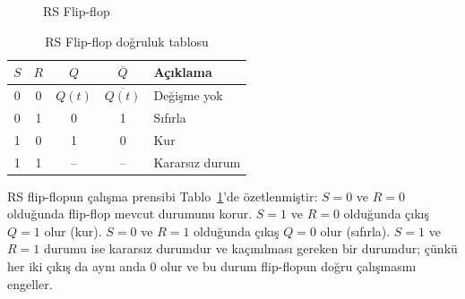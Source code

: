 \begin{figure}[H]
\centering
{}
\caption{RS Flip-flop}
\label{fig:B.24}
\end{figure}

\begin{table}[H]
\centering
\caption{RS Flip-flop doğruluk tablosu}
\label{tab:B.12}
\begin{tabular}{cc|cc|l}
\toprule
$S$ & $R$ & $Q$ & $\overline{Q}$ & \textbf{Açıklama} \\
\midrule
0 & 0 & $Q(t)$ & $\overline{Q(t)}$ & Değişme yok \\
0 & 1 & 0 & 1 & Sıfırla \\
1 & 0 & 1 & 0 & Kur \\
1 & 1 & -- & -- & Kararsız durum \\
\bottomrule
\end{tabular}
\end{table}

RS flip-flopun çalışma prensibi Tablo~\ref{tab:B.12}'de özetlenmiştir: $S = 0$ ve $R = 0$ olduğunda flip-flop mevcut durumunu korur. $S = 1$ ve $R = 0$ olduğunda çıkış $Q = 1$ olur (kur). $S = 0$ ve $R = 1$ olduğunda çıkış $Q = 0$ olur (sıfırla). $S = 1$ ve $R = 1$ durumu ise kararsız durumdur ve kaçınılması gereken bir durumdur; çünkü her iki çıkış da aynı anda 0 olur ve bu durum flip-flopun doğru çalışmasını engeller.

